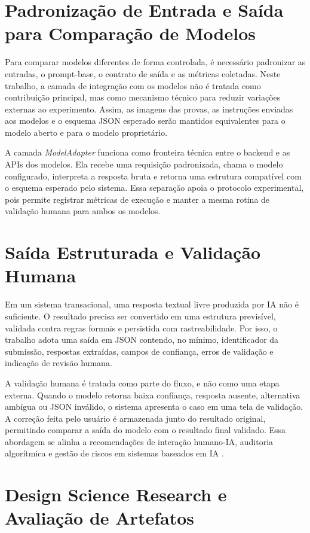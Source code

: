 \section{Padronização de Entrada e Saída para Comparação de Modelos}

Para comparar modelos diferentes de forma controlada, é necessário padronizar as entradas, o prompt-base, o contrato de saída e as métricas coletadas. Neste trabalho, a camada de integração com os modelos não é tratada como contribuição principal, mas como mecanismo técnico para reduzir variações externas ao experimento. Assim, as imagens das provas, as instruções enviadas aos modelos e o esquema JSON esperado serão mantidos equivalentes para o modelo aberto e para o modelo proprietário.

A camada \textit{ModelAdapter} funciona como fronteira técnica entre o backend e as APIs dos modelos. Ela recebe uma requisição padronizada, chama o modelo configurado, interpreta a resposta bruta e retorna uma estrutura compatível com o esquema esperado pelo sistema. Essa separação apoia o protocolo experimental, pois permite registrar métricas de execução e manter a mesma rotina de validação humana para ambos os modelos.

\section{Saída Estruturada e Validação Humana}

Em um sistema transacional, uma resposta textual livre produzida por IA não é suficiente. O resultado precisa ser convertido em uma estrutura previsível, validada contra regras formais e persistida com rastreabilidade. Por isso, o trabalho adota uma saída em JSON contendo, no mínimo, identificador da submissão, respostas extraídas, campos de confiança, erros de validação e indicação de revisão humana.

A validação humana é tratada como parte do fluxo, e não como uma etapa externa. Quando o modelo retorna baixa confiança, resposta ausente, alternativa ambígua ou JSON inválido, o sistema apresenta o caso em uma tela de validação. A correção feita pelo usuário é armazenada junto do resultado original, permitindo comparar a saída do modelo com o resultado final validado. Essa abordagem se alinha a recomendações de interação humano-IA, auditoria algorítmica e gestão de riscos em sistemas baseados em IA \cite{amershi2019humanai,raji2020audit,nist2023airmf}.

\section{Design Science Research e Avaliação de Artefatos}


